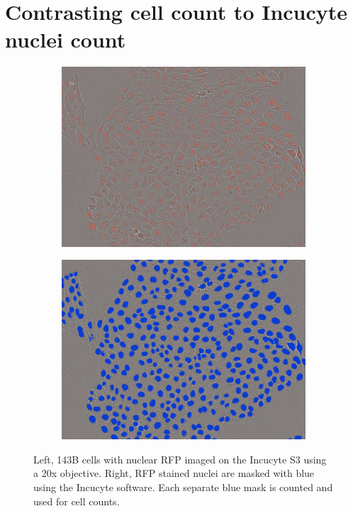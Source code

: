 \FloatBarrier
\section{Contrasting cell count to Incucyte nuclei count}
\begin{figure}[ht]
     \centering
     \begin{subfigure}[b]{0.3\textwidth}
         \includegraphics[width=\textwidth]{figures/sapp/IC/143B-Nuc_RFP.jpg}
     \end{subfigure}
     \begin{subfigure}[b]{0.3\textwidth}
         \includegraphics[width=\textwidth]{figures/sapp/IC/143B-Nuc_RFP_count.jpg}
     \end{subfigure}
        \caption[Incucyte RFP nuclei count in 143B.]{
        Left, 143B cells with nuclear RFP imaged on the Incucyte S3 using a 20x objective.
        Right, RFP stained nuclei are masked with blue using the Incucyte software.
        Each separate blue mask is counted and used for cell counts.
        }
        \label{fig:sapp:IC:143B_Nuc_RFP_ICimg}
\end{figure}

